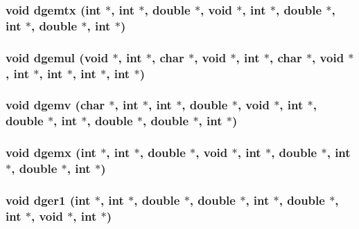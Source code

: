 \subsubsection{\setlength{\rightskip}{0pt plus 5cm}void dgemtx (int $\ast$, int $\ast$, double $\ast$, void $\ast$, int $\ast$, double $\ast$, int $\ast$, double $\ast$, int $\ast$)}\label{essl_8h_7cae4e530b1495cf730609ef2abea9ab}


\subsubsection{\setlength{\rightskip}{0pt plus 5cm}void dgemul (void $\ast$, int $\ast$, char $\ast$, void $\ast$, int $\ast$, char $\ast$, void $\ast$, int $\ast$, int $\ast$, int $\ast$, int $\ast$)}\label{essl_8h_dce64dd03803553ca4c23529ee7411ee}


\subsubsection{\setlength{\rightskip}{0pt plus 5cm}void dgemv (char $\ast$, int $\ast$, int $\ast$, double $\ast$, void $\ast$, int $\ast$, double $\ast$, int $\ast$, double $\ast$, double $\ast$, int $\ast$)}\label{essl_8h_5076a5d7e5653cd49ee33208189c7916}


\subsubsection{\setlength{\rightskip}{0pt plus 5cm}void dgemx (int $\ast$, int $\ast$, double $\ast$, void $\ast$, int $\ast$, double $\ast$, int $\ast$, double $\ast$, int $\ast$)}\label{essl_8h_2bd50064d6893be358d2a8b5135a0796}


\subsubsection{\setlength{\rightskip}{0pt plus 5cm}void dger1 (int $\ast$, int $\ast$, double $\ast$, double $\ast$, int $\ast$, double $\ast$, int $\ast$, void $\ast$, int $\ast$)}\label{essl_8h_944bf917148f0780bf6f63c76102e6bd}


